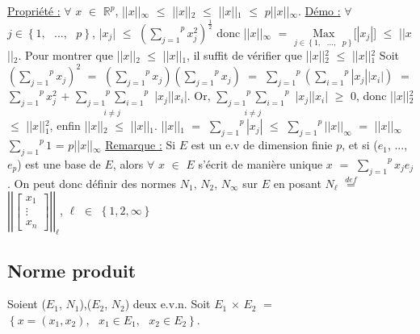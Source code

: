 \documentclass{article}
\begin{document}
\smallbreak
\parindent=0cm
\underline{Propriété :} $\forall$ $x$ $\in$ $\mathbb{R}^p$, ||$x$||$_{\infty}$ $\leqslant$ ||$x$||$_2$ $\leqslant$ ||$x$||$_1$ $\leqslant$ $p$||$x$||$_{\infty}$.
\smallbreak
\underline{Démo :} \parindent=1cm $\forall$ $j \in \left\{ 1,\text{ }...,\text{ }p \right\} $, |$x_j$| $\leqslant$ $\left(\overset{p}{\underset{j = 1}{\sum}} x_j^2\right)^{\frac{1}{2}}$ donc ||$x$||$_{\infty}$ $=$ $\underset{j \in \left\{ 1,\text{ }...,\text{ }p \right\} }{\text{Max}}$[$|x_j|$] $\leqslant$ ||$x$||$_2$.
\smallbreak
Pour montrer que ||$x$||$_2$ $\leqslant$ ||$x$||$_1$, il suffit de vérifier que ||$x$||$_2^2$ $\leqslant$ ||$x$||$_1^2$
\smallbreak
Soit $\left( \overset{p}{\underset{j = 1}{\sum}} x_j\right)^2$ $=$ $\left( \overset{p}{\underset{j = 1}{\sum}} x_j\right)$$\left(\overset{p}{\underset{j = 1}{\sum}} x_j\right)$ $=$ $\overset{p}{\underset{j = 1}{\sum}}\left( \overset{p}{\underset{i = 1}{\sum}} |x_j||x_i|\right)$ $=$ $\overset{p}{\underset{j = 1}{\sum}} x_j^2$ $+$ $\underset{i \neq j}{\overset{p}{\underset{j = 1}{\sum}} \overset{p}{\underset{i = 1}{\sum}}}$ |$x_j$||$x_i$|. Or, $\underset{i \neq j}{\overset{p}{\underset{j = 1}{\sum}} \overset{p}{\underset{i = 1}{\sum}}}$ |$x_j$||$x_i$| $\geqslant$ $0$, donc \smallbreak ||$x$||$_2^2$ $\leqslant$ ||$x$||$_1^2$, enfin ||$x$||$_2$ $\leqslant$ ||$x$||$_1$.
\smallbreak
||$x$||$_1$ $=$ $\overset{p}{\underset{j = 1}{\sum}}|x_j|$ $\leqslant$ $\overset{p}{\underset{j = 1}{\sum}}||x||_{\infty} $ $=$ ||$x$||$_{\infty}$$\overset{p}{\underset{j = 1}{\sum}} 1 $ = $p$||$x$||$_{\infty}$
\smallbreak
\parindent=0cm
\underline{Remarque :} \parindent=1cm \smallbreak Si $E$ est un e.v de dimension finie $p$, et si ($e_1$, ..., $e_p$) est une base de $E$, alors $\forall$ $x$ $\in$ $E$ s'écrit de \smallbreak manière unique $x$ $=$ $\overset{p}{\underset{j = 1}{\sum}}x_j e_j$. On peut donc définir des normes $N_1$, $N_2$, $N_{\infty}$ sur $E$ en posant \smallbreak $N_{\ell}$ $\overset{ def }{=}$ $\left| \left|
\begin{bmatrix}
	x_1 \\
	\vdots \\
	x_n
\end{bmatrix}
\right| \right|_{\ell}$, $\ell$ $\in$ $\left\{1, 2, \infty \right\}$

\subsection{Norme produit}
\parindent=0cm
Soient ($E_1$, $N_1$),($E_2$, $N_2$) deux e.v.n. Soit $E_1$ $\times$ $E_2$ $=$ $\left\{ x = (x_1, x_2),\text{ }  x_1 \in E_1,\text{ } x_2 \in E_2 \right\}$. 
\end{document}
